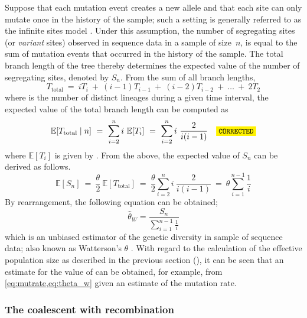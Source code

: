 Suppose that each mutation event creates a new allele and that each site can only mutate once in the history of the sample; such a setting is generally referred to as the infinite sites model \citep{Kimura:1969tn,Watterson:1975ur}.
Under this assumption, the number of segregating sites (or \emph{variant} sites) observed in sequence data in a sample of size~$n$, is equal to the sum of mutation events that occurred in the history of the sample.
The total branch length of the tree thereby determines the expected value of the number of segregating sites, denoted by $S_n$.
From the sum of all branch lengths, \ie
\begin{equation*}
	T_\text{total} ~=~ i T_i ~+~ (i-1) T_{i-1} ~+~ (i-2) T_{i-2} ~+~ \ldots ~+~ 2 T_2
\end{equation*}
where  is the number of distinct lineages during a given time interval,
the expected value of the total branch length can be computed as
\begin{equation}
	\mathbb{E}[T_\text{total} \mid n]
	~=~ \sum_{i=2}^{n} i ~ \mathbb{E}[T_i]
	~=~ \sum_{i=2}^{n} i ~ \frac{2}{i(i-1)} \CorrectLabel
\end{equation}
where ${\mathbb{E}[T_i]}$ is given by .
From the above, the expected value of $S_n$ can be derived as follows.
\begin{equation}
	\mathbb{E}[S_n]
	~=~ \frac{\theta}{2} ~ \mathbb{E}[T_\text{total}]
	~=~ \frac{\theta}{2} \sum_{i=2}^{n} i ~ \frac{2}{i(i-1)}
	~=~ \theta \sum_{i=1}^{n-1} \frac{1}{i}
\end{equation}
By rearrangement, the following equation can be obtained;
\begin{equation}\label{eq:theta_w}
	\hat{\theta}_W = \frac{S_n}{\sum_{i=1}^{n-1} \frac{1}{i}}
\end{equation}
which is an unbiased estimator of the genetic diversity in  sample of sequence data; also known as Watterson's $\theta$ \citep{Watterson:1975ur}.
With regard to the calculation of the effective population size as described in the previous section (), it can be seen that an estimate for the value of \Ne can be obtained, for example, from \cref{eq:mutrate,eq:theta_w} given an estimate of the mutation rate.


%
\subsubsection{The coalescent with recombination}
%


